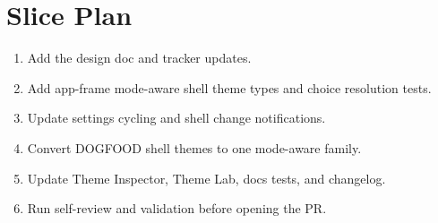 \section{Slice Plan}\label{record-181-slice-plan}

\begin{enumerate}
\def\labelenumi{\arabic{enumi}.}
\tightlist
\item
  Add the design doc and tracker updates.
\item
  Add app-frame mode-aware shell theme types and choice resolution tests.
\item
  Update settings cycling and shell change notifications.
\item
  Convert DOGFOOD shell themes to one mode-aware family.
\item
  Update Theme Inspector, Theme Lab, docs tests, and changelog.
\item
  Run self-review and validation before opening the PR.
\end{enumerate}

